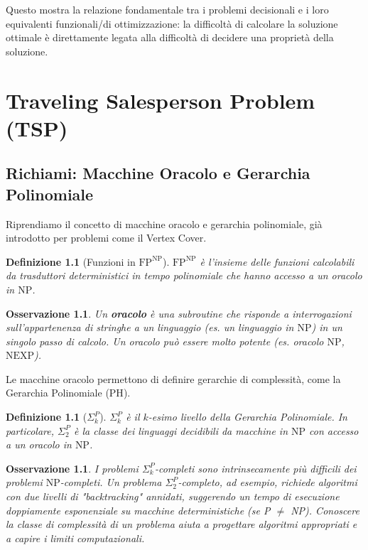 \documentclass[a4paper, 11pt]{book} %
\newtheorem{definition}[theorem]{Definizione}
\newtheorem{remark}[theorem]{Osservazione}
\theoremstyle{definition}
\begin{document}
Questo mostra la relazione fondamentale tra i problemi decisionali e i loro equivalenti funzionali/di ottimizzazione: la difficoltà di calcolare la soluzione ottimale è direttamente legata alla difficoltà di decidere una proprietà della soluzione.



\chapter{Traveling Salesperson Problem (TSP)}



\section{Richiami: Macchine Oracolo e Gerarchia Polinomiale}

Riprendiamo il concetto di macchine oracolo e gerarchia polinomiale, già introdotto per problemi come il Vertex Cover.

\begin{definition}[Funzioni in $\text{FP}^{\text{NP}}$]
$\text{FP}^{\text{NP}}$ è l'insieme delle funzioni calcolabili da trasduttori deterministici in tempo polinomiale che hanno accesso a un oracolo in $\text{NP}$.
\end{definition}

\begin{remark}
Un \textbf{oracolo} è una subroutine che risponde a interrogazioni sull'appartenenza di stringhe a un linguaggio (es. un linguaggio in $\text{NP}$) in un singolo passo di calcolo. Un oracolo può essere molto potente (es. oracolo $\text{NP}$, $\text{NEXP}$).
\end{remark}

Le macchine oracolo permettono di definire gerarchie di complessità, come la Gerarchia Polinomiale ($\text{PH}$).
\begin{definition}[$\Sigma_k^P$]
$\Sigma_k^P$ è il $k$-esimo livello della Gerarchia Polinomiale. In particolare, $\Sigma_2^P$ è la classe dei linguaggi decidibili da macchine in $\text{NP}$ con accesso a un oracolo in $\text{NP}$.
\end{definition}

\begin{remark}
I problemi $\Sigma_k^P$-completi sono intrinsecamente più difficili dei problemi $\text{NP}$-completi. Un problema $\Sigma_2^P$-completo, ad esempio, richiede algoritmi con due livelli di "backtracking" annidati, suggerendo un tempo di esecuzione doppiamente esponenziale su macchine deterministiche (se P $\neq$ NP). Conoscere la classe di complessità di un problema aiuta a progettare algoritmi appropriati e a capire i limiti computazionali.
\end{remark}
\end{document}
